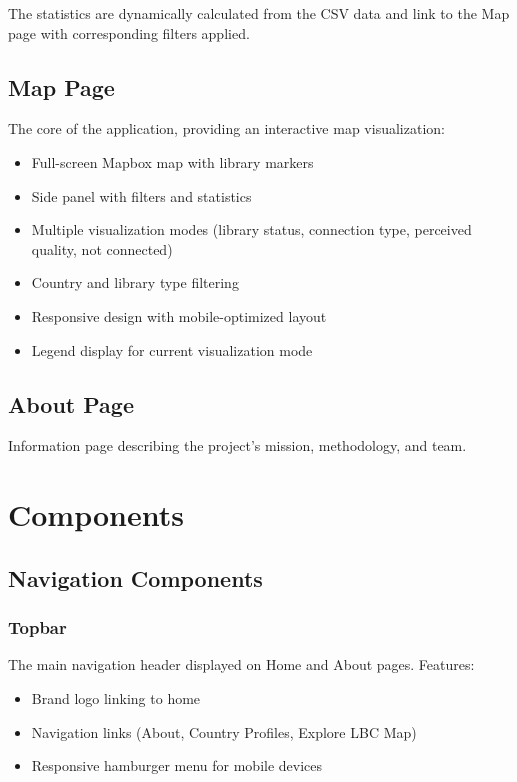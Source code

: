\documentclass[11pt,a4paper]{article}
\begin{document}
The statistics are dynamically calculated from the CSV data and link to the Map page with corresponding filters applied.

\subsection{Map Page}

The core of the application, providing an interactive map visualization:
\begin{itemize}
    \item Full-screen Mapbox map with library markers
    \item Side panel with filters and statistics
    \item Multiple visualization modes (library status, connection type, perceived quality, not connected)
    \item Country and library type filtering
    \item Responsive design with mobile-optimized layout
    \item Legend display for current visualization mode
\end{itemize}

\subsection{About Page}

Information page describing the project's mission, methodology, and team.

\section{Components}

\subsection{Navigation Components}

\subsubsection{Topbar}
The main navigation header displayed on Home and About pages. Features:
\begin{itemize}
    \item Brand logo linking to home
    \item Navigation links (About, Country Profiles, Explore LBC Map)
    \item Responsive hamburger menu for mobile devices
\end{itemize}
\end{document}
